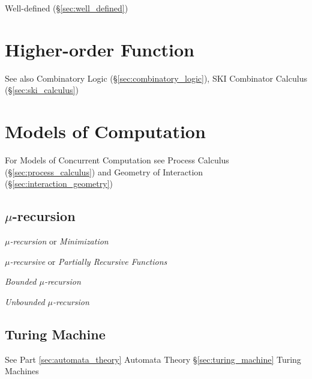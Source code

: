 Well-defined (\S\ref{sec:well_defined})



\section{Higher-order Function}\label{sec:higherorder_function}

\fist See also Combinatory Logic (\S\ref{sec:combinatory_logic}), SKI
Combinator Calculus (\S\ref{sec:ski_calculus})



\section{Models of Computation}\label{sec:computation_model}

\fist For Models of Concurrent Computation see Process Calculus
(\S\ref{sec:process_calculus}) and Geometry of Interaction
(\S\ref{sec:interaction_geometry})



\subsection{$\mu$-recursion}\label{sec:mu_recursion}

\emph{$\mu$-recursion} or \emph{Minimization}

\emph{$\mu$-recursive} or \emph{Partially Recursive Functions}

\emph{Bounded $\mu$-recursion}

\emph{Unbounded $\mu$-recursion}



\subsection{Turing Machine}

See Part \ref{sec:automata_theory} Automata Theory
\S\ref{sec:turing_machine} Turing Machines



